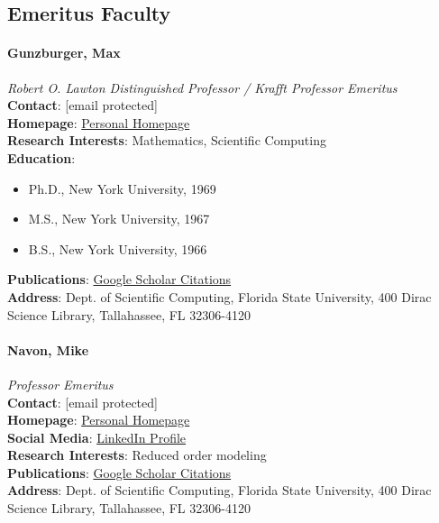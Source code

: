 \documentclass[12pt,a4paper]{article}
\begin{document}
\subsection{Emeritus Faculty}

\paragraph{Gunzburger, Max}
\textit{Robert O. Lawton Distinguished Professor / Krafft Professor Emeritus}\\
\textbf{Contact}: [email protected]\\
\textbf{Homepage}: \href{http://people.sc.fsu.edu/~mgunzburger/}{Personal Homepage}\\
\textbf{Research Interests}: Mathematics, Scientific Computing\\
\textbf{Education}:
\begin{itemize}
    \item Ph.D., New York University, 1969
    \item M.S., New York University, 1967
    \item B.S., New York University, 1966
\end{itemize}
\textbf{Publications}: \href{https://scholar.google.com/citations?user=c22gq9kAAAAJ}{Google Scholar Citations}\\
\textbf{Address}: Dept. of Scientific Computing, Florida State University, 400 Dirac Science Library, Tallahassee, FL 32306-4120

\paragraph{Navon, Mike}
\textit{Professor Emeritus}\\
\textbf{Contact}: [email protected]\\
\textbf{Homepage}: \href{http://people.sc.fsu.edu/~inavon/}{Personal Homepage}\\
\textbf{Social Media}: \href{https://www.linkedin.com/in/mike-navon-5932599/}{LinkedIn Profile}\\
\textbf{Research Interests}: Reduced order modeling\\
\textbf{Publications}: \href{https://scholar.google.com/citations?user=R9g8FzoAAAAJ}{Google Scholar Citations}\\
\textbf{Address}: Dept. of Scientific Computing, Florida State University, 400 Dirac Science Library, Tallahassee, FL 32306-4120
\end{document}
